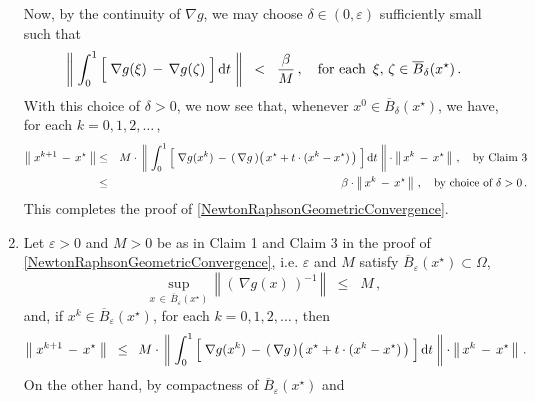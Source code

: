 \begin{enumerate}
	\vskip 0.3cm
	\noindent
	Now, by the continuity of $\nabla g$, we may choose $\delta \in (0,\varepsilon)$
	sufficiently small such that
	\begin{equation*}
		\left\Vert\;
			\int_{0}^{1}
			\left[\;
				\overset{{\color{white}.}}{\nabla} g(\xi) \,-\, \nabla g(\zeta)
			\;\right]
			\d t
		\;\right\Vert
		\;\; < \;\; \dfrac{\beta}{M}\,,
		\quad
		\textnormal{for each \,$\xi, \, \zeta \in \overline{B}_{\delta}(x^{\star})$}\,.
	\end{equation*}
	With this choice of $\delta > 0$, we now see that,
	whenever $x^{0} \in \overline{B}_{\delta}(x^{\star})$, we have, for each $k = 0, 1, 2, \ldots$\,,
	\begin{eqnarray*}
	\left\Vert\;x^{k+1} \,-\, x^{\star}\;\right\Vert
	&\leq&
		M \cdot\,
		\left\Vert\;
			\int_{0}^{1}
			\left[\;
				\overset{{\color{white}.}}{\nabla} g(x^{k})
				\,-\,
				\left(\,\nabla g\,\right)\!\left(\,x^{\star} + t\cdot(x^{k}-x^{\star})\,\right)
			\;\right]
			\d t
		\;\right\Vert
		\cdot
		\left\Vert\,x^{k} \,-\, x^{\star}\,\right\Vert\,,
		\quad
		\textnormal{by Claim 3}
	\\
	&\leq&
		\beta \cdot \left\Vert\,x^{k} \,-\, x^{\star}\,\right\Vert\,,
		\quad
		\textnormal{by choice of $\delta > 0$}\,.
	\end{eqnarray*}
	This completes the proof of \eqref{NewtonRaphsonGeometricConvergence}.
\item
	Let $\varepsilon > 0$ and $M > 0$ be as in Claim 1 and Claim 3
	in the proof of \eqref{NewtonRaphsonGeometricConvergence},
	i.e. $\varepsilon$ and $M$ satisfy $\overline{B}_{\varepsilon}(x^{\star}) \subset \Omega$,
	\begin{equation*}
	\underset{x\,\in\,\overline{B}_{\varepsilon}(x^{\star})}{\sup}\,
	\left\Vert\;\left(\,\nabla g(x)\,\right)^{-1}\,\right\Vert
	\;\; \leq \;\; M\,,
	\end{equation*}
	and, if $x^{k} \in \overline{B}_{\varepsilon}(x^{\star})$,
	for each $k = 0, 1, 2, \ldots$\,, then
	\begin{equation*}
	\left\Vert\;x^{k+1} \,-\, x^{\star}\;\right\Vert
	\;\; \leq \;\;
		M \cdot\,
		\left\Vert\;
			\int_{0}^{1}
			\left[\;
				\overset{{\color{white}.}}{\nabla} g(x^{k})
				\,-\,
				\left(\,\nabla g\,\right)\!\left(\,x^{\star} + t\cdot(x^{k}-x^{\star})\,\right)
			\;\right]
			\d t
		\;\right\Vert
		\cdot
		\left\Vert\,x^{k} \,-\, x^{\star}\,\right\Vert\,.
	\end{equation*}
	On the other hand, by compactness of $\overline{B}_{\varepsilon}(x^{\star})$ and

\end{enumerate}
